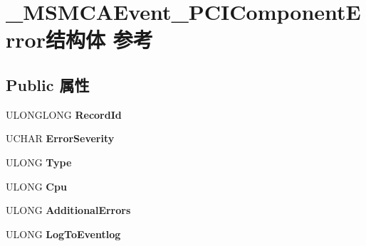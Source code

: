 \hypertarget{struct___m_s_m_c_a_event___p_c_i_component_error}{}\section{\+\_\+\+M\+S\+M\+C\+A\+Event\+\_\+\+P\+C\+I\+Component\+Error结构体 参考}
\label{struct___m_s_m_c_a_event___p_c_i_component_error}
\subsection*{Public 属性}
\begin{DoxyCompactItemize}
\item 
\mbox{\label{struct___m_s_m_c_a_event___p_c_i_component_error_a9e9fca6fb1396bbe3f812d6ed1e123eb}} 
U\+L\+O\+N\+G\+L\+O\+NG {\bfseries Record\+Id}
\item 
\mbox{\label{struct___m_s_m_c_a_event___p_c_i_component_error_a8015c6401b43a176b1e63f6e7a7faa85}} 
U\+C\+H\+AR {\bfseries Error\+Severity}
\item 
\mbox{\label{struct___m_s_m_c_a_event___p_c_i_component_error_acda5cd463f07442075c8303decea793e}} 
U\+L\+O\+NG {\bfseries Type}
\item 
\mbox{\label{struct___m_s_m_c_a_event___p_c_i_component_error_a9e01a3957108e0fd8c9f5a991343d81a}} 
U\+L\+O\+NG {\bfseries Cpu}
\item 
\mbox{\label{struct___m_s_m_c_a_event___p_c_i_component_error_a710463a2907a99c15ebd60f63c333544}} 
U\+L\+O\+NG {\bfseries Additional\+Errors}
\item 
\mbox{\label{struct___m_s_m_c_a_event___p_c_i_component_error_ae08eb226a81d7a3d4b92d38afd9feea1}} 
U\+L\+O\+NG {\bfseries Log\+To\+Eventlog}
\item 
\mbox{\label{struct___m_s_m_c_a_event___p_c_i_component_error_a0b541bc51f37d6cdb9467651a627ec48}} 

\end{DoxyCompactItemize}
